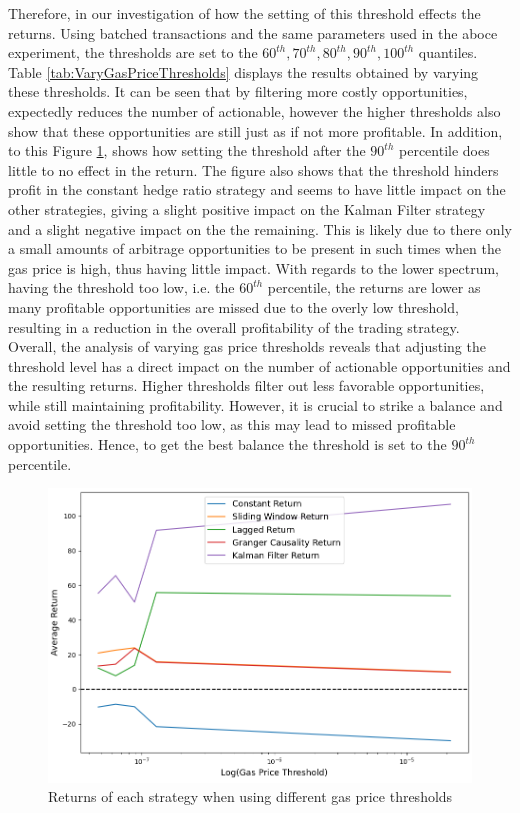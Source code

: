 \noindent Therefore, in our investigation of how the setting of this threshold effects the returns. Using batched transactions and the same parameters used in the aboce experiment, the thresholds are set to the $60^{th}, 70^{th},80^{th},90^{th},100^{th}$ quantiles. Table \ref{tab:VaryGasPriceThresholds} displays the results obtained by varying these thresholds. It can be seen that by filtering more costly opportunities, expectedly reduces the number of actionable, however the higher thresholds also show that these opportunities are still just as if not more profitable. In addition, to this Figure \ref{fig:VaryGasPriceThresholds}, shows how setting the threshold after the $90^{th}$ percentile does little to no effect in the return. The figure also shows that the threshold hinders profit in the constant hedge ratio strategy and seems to have little impact on the other strategies, giving a slight positive impact on the Kalman Filter strategy and a slight negative impact on the the remaining. This is likely due to there only a small amounts of arbitrage opportunities to be present in such times when the gas price is high, thus having little impact. With regards to the lower spectrum, having the threshold too low, i.e. the $60^{th}$ percentile, the returns are lower as many profitable opportunities are missed due to the overly low threshold, resulting in a reduction in the overall profitability of the trading strategy.
\\[5mm]
Overall, the analysis of varying gas price thresholds reveals that adjusting the threshold level has a direct impact on the number of actionable opportunities and the resulting returns. Higher thresholds filter out less favorable opportunities, while still maintaining profitability. However, it is crucial to strike a balance and avoid setting the threshold too low, as this may lead to missed profitable opportunities. Hence, to get the best balance the threshold is set to the $90^{th}$ percentile.

\begin{figure}[H]
    \centering
    \includegraphics[width=\linewidth]{evaluation/Images/VaryGPThreshold.png}
    \caption{Returns of each strategy when using different gas price thresholds}
    \label{fig:VaryGasPriceThresholds}
\end{figure}

